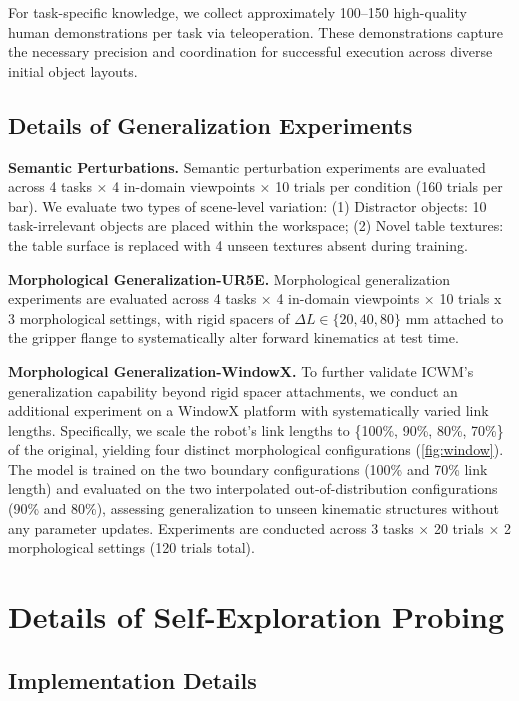 \documentclass{llmxive}
\begin{document}
For task-specific knowledge, we collect approximately 100–150 high-quality human demonstrations per task via teleoperation. These demonstrations capture the necessary precision and coordination for successful execution across diverse initial object layouts.






\subsection{Details of Generalization Experiments}
\label{app:gen}
\textbf{Semantic Perturbations.} 
Semantic perturbation experiments are evaluated across 4 tasks × 4 in-domain viewpoints × 10 trials per condition (160 trials per bar). We evaluate two types of scene-level variation: (1) Distractor objects: 10 task-irrelevant objects are placed within the workspace; (2) Novel table textures: the table surface is replaced with 4 unseen textures absent during training. 


\textbf{Morphological Generalization-UR5E.} 
Morphological generalization experiments are evaluated across 4 tasks × 4 in-domain viewpoints × 10 trials x 3 morphological settings, with rigid spacers of $\Delta L \in \{20, 40, 80\}$ mm attached to the gripper flange to systematically alter forward kinematics at test time.


\textbf{Morphological Generalization-WindowX.} 
\label{app:morph_windowx}
To further validate ICWM's generalization capability beyond rigid spacer attachments, we conduct an additional experiment on a WindowX platform with systematically varied link lengths. Specifically, we scale the robot's link lengths to \{100\%, 90\%, 80\%, 70\%\} of the original, yielding four distinct morphological configurations (\autoref{fig:window}). 
The model is trained on the two boundary configurations (100\% and 70\% link length) and evaluated on the two interpolated out-of-distribution configurations (90\% and 80\%), assessing generalization to unseen kinematic structures without any parameter updates. Experiments are conducted across 3 tasks $\times$ 20 trials $\times$ 2 morphological settings (120 trials total).




\section{Details of Self-Exploration Probing}
\label{app:random}
\subsection{Implementation Details}
\end{document}
